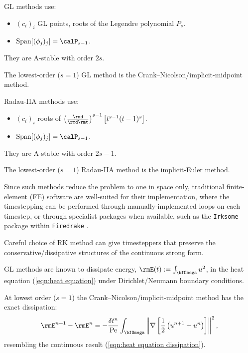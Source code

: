     \begin{example}
        GL methods use:
        \begin{itemize}
            \item  $(c_{i})_{i}$ GL points, roots of the Legendre polynomial $P_{s}$.
            \item  ${\rm Span}[(\phi_{j})_{j}]  =  \calP_{s - 1}$.
        \end{itemize}
        They are A-stable with order $2s$. \BA{[Ref]}

        The lowest-order ($s  =  1$) GL method is the Crank–Nicolson/implicit-midpoint method.
    \end{example}

    \begin{example}
        Radau-IIA methods use:
        \begin{itemize}
            \item  $(c_{i})_{i}$ roots of $\left(\frac{\rmd}{\rmd\rmt}\right)^{s - 1}\left[t^{s - 1}(t - 1)^{s}\right]$.
            \item  ${\rm Span}[(\phi_{j})_{j}]  =  \calP_{s - 1}$.
        \end{itemize}
        They are A-stable with order $2s - 1$. \BA{[Ref]}

        The lowest-order ($s  =  1$) Radau-IIA method is the implicit-Euler method.
    \end{example}
    \line
    
    Since such methods reduce the problem to one in space only, traditional finite-element (FE) software are well-suited for their implementation, where the timestepping can be performed through manually-implemented loops on each timestep, or through specialist packages when available, such as the \texttt{Irksome} package within \texttt{Firedrake} \BA{[Ref]}.

    Careful choice of RK method can give timesteppers that preserve the conservative/dissipative structures of the continuous strong form.

    \line
    
    \begin{example}
        GL methods are known to dissipate energy, $\rmE(t)  :=  \int_{\bfOmega}u^{2}$, in the heat equation (\ref{eqn:heat equation}) under Dirichlet/Neumann boundary conditions. \BA{[Ref]}
        
        At lowest order ($s  =  1$) the Crank–Nicolson/implicit-midpoint method has the exact dissipation:
        \begin{equation}\label{eqn:heat equation dissipation implicit midpoint}
            \rmE^{n + 1} - \rmE^{n}  =  - \frac{\delta t^{n}}{\rmPe}\int_{\bfOmega}\left\|\nabla\left[\frac{1}{2}\left(u^{n + 1} + u^{n}\right)\right]\right\|^{2},
        \end{equation}
        resembling the continuous result (\ref{eqn:heat equation dissipation}).
    \end{example}
    

